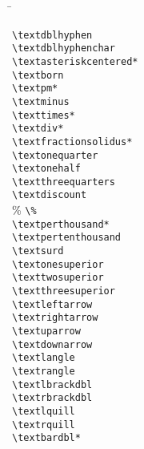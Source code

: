 \begin{multicols}{3}
\begin{tabbing}
%
\textpertenthousand \hspace{0.01cm} \= \kill %
	
\textdblhyphen  			\> \lstinline|\textdblhyphen|\\
\textdblhyphenchar 		\> \lstinline|\textdblhyphenchar|\\
\textasteriskcentered			\> \lstinline|\textasteriskcentered*|\\
\textborn							\> \lstinline|\textborn|\\
\textpm 							\> \lstinline|\textpm*|\\
\textminus						\> \lstinline|\textminus|\\

\texttimes						\> \lstinline|\texttimes*|\\
\textdiv							\> \lstinline|\textdiv*|\\
\textfractionsolidus	\> \lstinline|\textfractionsolidus*|\\

\textonequarter				\> \lstinline|\textonequarter|\\
\textonehalf 					\> \lstinline|\textonehalf|\\
\textthreequarters		\> \lstinline|\textthreequarters|\\

\textdiscount					\> \lstinline|\textdiscount|\\
\%										\> \lstinline|\%|\\
\textperthousand 			\> \lstinline|\textperthousand* |\\
\textpertenthousand		\> \lstinline|\textpertenthousand|\\
\textsurd 						\> \lstinline|\textsurd|\\
\textonesuperior 			\> \lstinline|\textonesuperior|\\
\texttwosuperior			\> \lstinline|\texttwosuperior|\\
\textthreesuperior 		\> \lstinline|\textthreesuperior|\\

\textleftarrow 				\> \lstinline|\textleftarrow |\\
\textrightarrow				\> \lstinline|\textrightarrow|\\
\textuparrow 					\> \lstinline|\textuparrow|\\
\textdownarrow				\> \lstinline|\textdownarrow|\\

\textlangle  					\> \lstinline|\textlangle|\\
\textrangle 					\> \lstinline|\textrangle|\\
\textlbrackdbl 				\> \lstinline|\textlbrackdbl|\\
\textrbrackdbl				\> \lstinline|\textrbrackdbl|\\
\textlquill						\> \lstinline|\textlquill|\\
\textrquill						\> \lstinline|\textrquill|\\
\textbardbl						\> \lstinline|\textbardbl*	|\\

\end{tabbing}
\end{multicols}
